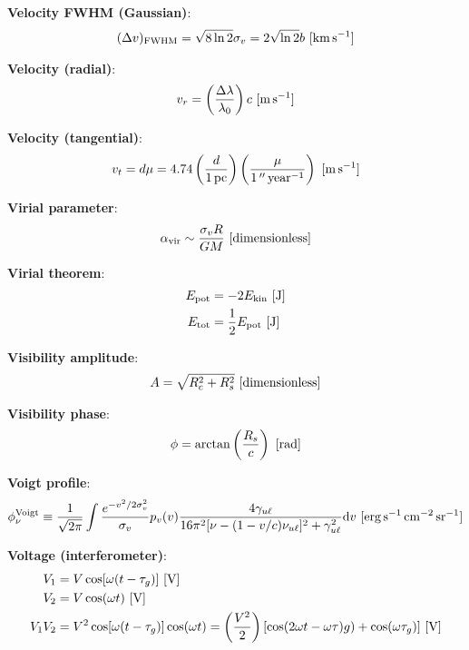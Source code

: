 \documentclass[a4paper,10pt]{article}
\begin{document}
{\noindent}\textbf{Velocity FWHM (Gaussian)}:
\begin{align*}
    (\Delta v)_{\rm FWHM} = \sqrt{8\ln2}\sigma_v = 2\sqrt{\ln2}b ~ [{\rm km\,s^{-1}}]
\end{align*}

{\noindent}\textbf{Velocity (radial)}:
\begin{align*}
    v_r = \left(\frac{\Delta\lambda}{\lambda_0}\right)c ~ [{\rm m\,s^{-1}}]
\end{align*}

{\noindent}\textbf{Velocity (tangential)}:
\begin{align*}
    v_t = d\mu = 4.74\left(\frac{d}{1\,{\rm pc}}\right) \left(\frac{\mu}{1\,''\,{\rm year^{-1}}}\right) ~ [{\rm m\,s^{-1}}]
\end{align*}

{\noindent}\textbf{Virial parameter}:
\begin{align*}
    \alpha_\mathrm{vir} \sim \frac{\sigma_vR}{GM} ~ [{\rm dimensionless}]
\end{align*}

{\noindent}\textbf{Virial theorem}:
\begin{align*}
    E_\mathrm{pot} &= -2E_\mathrm{kin} ~ [{\rm J}] \\
    E_\mathrm{tot} &= \frac{1}{2}E_\mathrm{pot} ~ [{\rm J}]
\end{align*}

{\noindent}\textbf{Visibility amplitude}:
\begin{align*}
    A = \sqrt{R_c^2 + R_s^2} ~ [{\rm dimensionless}]
\end{align*}

{\noindent}\textbf{Visibility phase}:
\begin{align*}
    \phi = \arctan \left(\frac{R_s}{c}\right) ~ [{\rm rad}]
\end{align*}

{\noindent}\textbf{Voigt profile}:
\begin{align*}
    \phi_\nu^{\rm Voigt} \equiv \frac{1}{\sqrt{2\pi}} \int \frac{e^{-v^2/2\sigma_v^2}}{\sigma_v} p_v(v) \frac{4\gamma_{u\ell}}{16\pi^2[\nu-(1-v/c)\nu_{u\ell}]^2 + \gamma_{u\ell}^2}{\rm d}v  ~ [{\rm erg\,s^{-1}\,cm^{-2}\,sr^{-1}}]
\end{align*}

{\noindent}\textbf{Voltage (interferometer)}:
\begin{align*}
    V_1 &= V\cos[\omega(t-\tau_g)] ~ [{\rm V}] \\
    V_2 &= V\cos(\omega t) ~ [{\rm V}] \\
    V_1V_2 &= V^2\cos[\omega(t-\tau_g)]\cos(\omega t) = \left(\frac{V^2}{2}\right) [\cos(2\omega t-\omega \tau)g)+\cos(\omega\tau_g)] ~ [{\rm V}]
\end{align*}
\end{document}
